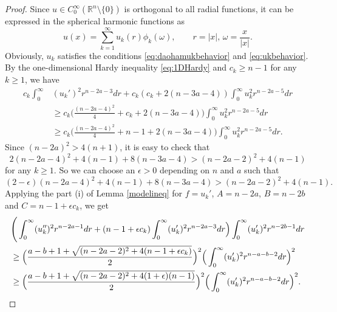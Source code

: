 \documentclass[a4paper,12pt]{article}
\theoremstyle{plain}
\theoremstyle{definition}
\theoremstyle{remark}
\def\R{\mathbb R}%
\def\ep{\epsilon}%
\numberwithin{equation}{section}
\begin{document}
\begin{proof}
Since $u\in C_0^\infty(\R^n\setminus\{0\})$ is orthogonal to all radial functions,  it can be expressed in the spherical harmonic functions as
\[
u(x) = \sum_{k=1}^\infty u_k(r) \phi_k(\omega),\qquad r = |x|, \,\omega = \frac x{|x|}.
\]
Obviously, $u_k$ satisfies the conditions \eqref{eq:daohamukbehavior} and \eqref{eq:ukbehavior}. By the one-dimensional Hardy inequality \eqref{eq:1DHardy} and $c_k \geq n-1$ for any $k\geq 1$, we have
\begin{align*}
c_k \int_0^\infty &(u_k')^2 r^{n-2a -3} dr + c_k(c_k + 2(n-3a -4))\int_0^\infty u_k^2 r^{n -2a -5} dr\\
&\geq c_k\Big(\frac{(n-2a -4)^2}4 + c_k +2(n-3a -4)\Big)\int_0^\infty u_k^2 r^{n -2a -5} dr\\
&\geq c_k \Big(\frac{(n-2a -4)^2}4 + n-1 +2(n-3a -4)\Big)\int_0^\infty u_k^2 r^{n -2a -5} dr.
\end{align*}
Since $(n-2a)^2 > 4(n+1)$, it is easy to check that
\begin{equation*}
2(n -2a -4)^2 + 4(n-1) + 8(n-3a -4) > (n -2a -2)^2 + 4(n-1)
\end{equation*}
for any $k \geq 1$. So we can choose an $\epsilon > 0$ depending on $n$ and $a$ such that
\begin{equation}\label{eq:compareDelta}
(2-\epsilon)(n -2a -4)^2 + 4(n-1) + 8(n-3a -4) > (n -2a -2)^2 + 4(n-1).
\end{equation}
Applying the part (i) of Lemma \ref{modelineq} for $f= u_k'$, $A =n -2a$, $B = n-2b$ and $C = n-1 + \epsilon c_k$, we get
\begin{align*}%
&\Bigg(\int_0^\infty (u_k'')^2 r^{n-2a -1} dr + (n-1 +\epsilon c_k) \int_0^\infty (u_k')^2 r^{n-2a -3} dr\Big)\int_0^\infty (u_k')^2 r^{n-2b -1} dr\notag\\
&\geq \Big(\frac{a-b+1 + \sqrt{(n-2a -2)^2 + 4(n-1 +\epsilon c_k)}}2\Big)^2 \Big(\int_0^\infty (u_k')^2 r^{n-a -b-2} dr\Big)^2\notag\\
&\geq \Big(\frac{a-b+1 + \sqrt{(n-2a -2)^2 + 4(1+\ep)(n-1)}}2\Big)^2 \Big(\int_0^\infty (u_k')^2 r^{n-a -b-2} dr\Big)^2.
\end{align*}


\end{proof}
\end{document}
